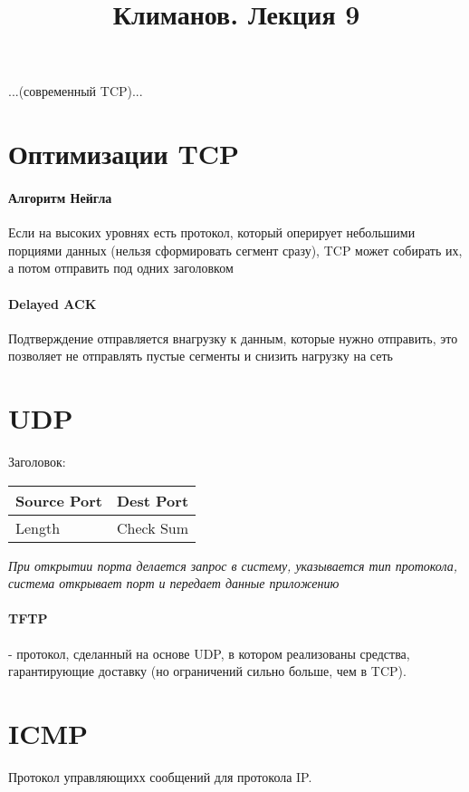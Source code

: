 \documentclass[a4paper,10pt]{article}
\title{Климанов. Лекция 9}
\begin{document}
	\maketitle
	
	...(современный TCP)...
	
	\section{Оптимизации TCP}
	\paragraph{Алгоритм Нейгла} Если на высоких уровнях есть протокол, который оперирует небольшими порциями данных (нельзя сформировать сегмент сразу), TCP может собирать их, а потом отправить под одних заголовком
	
	\paragraph{Delayed ACK} Подтверждение отправляется внагрузку к данным, которые нужно отправить, это позволяет не отправлять пустые сегменты и снизить нагрузку на сеть
	
	\section{UDP}
	
	Заголовок:
	
	\begin{table}[h]
		\begin{tabular}{|l|l|}
			\hline
			Source Port & Dest Port \\ \hline
			Length      & Check Sum \\ \hline
		\end{tabular}
	\end{table}

	\textit{При открытии порта делается запрос в систему, указывается тип протокола, система открывает порт и передает данные приложению}
	
	\paragraph{TFTP} - протокол, сделанный на основе UDP, в котором реализованы средства, гарантирующие доставку (но ограничений сильно больше, чем в TCP).
	
	\section{ICMP}
	Протокол управляющихх сообщений для протокола IP.
	
\end{document}
